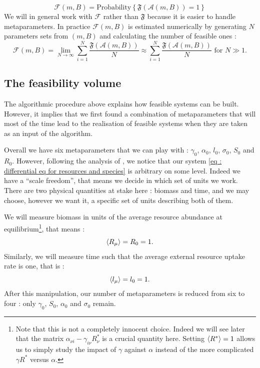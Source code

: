 \documentclass[12pt, titlepage]{report}
\begin{document}
\begin{equation}\boxed{
\mathcal{F}(m, B)=\text{Probability}\left\{\mathfrak{F}\left(\mathcal{A}(m, B)\right)=1\right\}
}
\end{equation}
We will in general work with $\mathcal{F}$ rather than $\mathfrak{F}$ because it is easier to handle metaparameters. In practice $\mathcal{F}(m, B)$ is estimated numerically by generating $N$ parameters sets from $(m,B)$ and calculating the number of feasible ones :
\begin{equation}
\mathcal{F}(m, B) = \lim_{N\rightarrow \infty} \sum_{i=1}^N \frac{\mathfrak{F}(\mathcal{A}(m,B))}{N} \approx \sum_{i=1}^N \frac{\mathfrak{F}(\mathcal{A}(m,B))}{N} \text{ for } N \gg 1.
\end{equation}

\subsection{The feasibility volume}
The algorithmic procedure above explains how feasible systems can be built. However, it implies that we first found a combination of metaparameters that will most of the time lead to the realisation of feasible systems when they are taken as an input of the algorithm.

Overall we have six metaparameters that we can play with : $\gamma_0$, $\alpha_0$, $l_0$, $\sigma_0$, $S_0$ and $R_0$. However, following the analysis of \cite{barbier_cavity_2017}, we notice that our system \eqref{eq : differential eq for resources and species} is arbitrary on some level. Indeed we have a ``scale freedom'', that means we decide in which set of units we work. There are two physical quantities at stake here : biomass and time, and we may choose, however we want it, a specific set of units describing both of them.

We will measure biomass in units of the average resource abundance at equilibrium\footnote{Note that this is not a completely innocent choice. Indeed we will see later that the matrix $\alpha_{\nu i}-\gamma_{i \nu} R^*_\nu$ is a crucial quantity here. Setting $\langle R^* \rangle=1$ allows us to simply study the impact of $\gamma$ against $\alpha$ instead of the more complicated $\gamma R^*$ versus $\alpha$.}, that means :
\begin{equation}
 \langle R_\mu \rangle = R_0 = 1.
\end{equation}
Similarly, we will measure time such that the average external resource uptake rate is one, that is :
\begin{equation}
\langle l_\mu \rangle = l_0 = 1.
\end{equation}
After this manipulation, our number of metaparameters is reduced from six to four : only $\gamma_0$, $S_0$, $\alpha_0$ and $\sigma_0$ remain.
\end{document}
